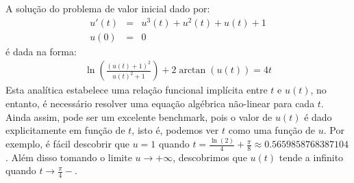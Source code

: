  \begin{ex} A solução do problema de valor inicial dado por:
\begin{eqnarray}
u'(t)&=&u^3(t)+u^2(t)+u(t)+1\\
u(0)&=&0
\end{eqnarray}
é dada na forma:
\begin{eqnarray}
\ln  \left(\frac{\left(u(t) +1\right)^2}{u(t)^2+1}\right) +2\arctan \left( u \left( t \right)  \right) =4t
\end{eqnarray}
Esta analítica estabelece uma relação funcional implícita entre $t$ e $u(t)$, no entanto, é necessário resolver uma equação algébrica não-linear para cada $t$. Ainda assim, pode ser um excelente benchmark, pois o valor de $u(t)$ é dado explicitamente em função de $t$, isto é, podemos ver $t$ como uma função de $u$. Por exemplo, é fácil descobrir que $u=1$ quando $t=\frac{\ln(2)}{4}+\frac{\pi}{8}\approx 0.5659858768387104$. Além disso tomando o limite $u\to +\infty$, descobrimos que $u(t)$ tende a infinito quando $t\to \frac{\pi}{4}-$.
\end{ex}

